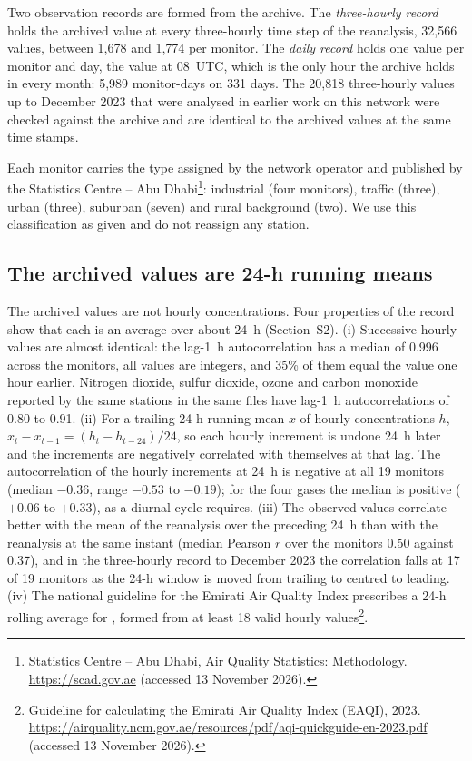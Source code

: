 Two observation records are formed from the archive. The \emph{three-hourly record} holds the
archived value at every three-hourly time step of the reanalysis, 32,566 values, between 1,678
and 1,774 per monitor. The \emph{daily record} holds one value per monitor and day, the value at
08~UTC, which is the only hour the archive holds in every month: 5,989 monitor-days on 331 days.
The 20,818 three-hourly values up to December 2023 that were analysed in earlier work on this
network were checked against the archive and are identical to the archived values at the same
time stamps.

Each monitor carries the type assigned by the network operator and published by the Statistics
Centre -- Abu Dhabi\footnote{Statistics Centre -- Abu Dhabi, Air Quality Statistics: Methodology. \url{https://scad.gov.ae} (accessed 13 November 2026).}: industrial (four monitors), traffic (three), urban
(three), suburban (seven) and rural background (two). We use this classification as given and do
not reassign any station.

\subsection{The archived values are 24-h running means}
\label{sec:running}

The archived \pmten{} values are not hourly concentrations. Four properties of the record show
that each is an average over about 24~h (Section~S2). (i) Successive hourly values are almost
identical: the lag-1~h autocorrelation has a median of 0.996 across the monitors, all values are
integers, and 35\% of them equal the value one hour earlier. Nitrogen dioxide, sulfur dioxide,
ozone and carbon monoxide reported by the same stations in the same files have lag-1~h
autocorrelations of 0.80 to 0.91. (ii) For a trailing 24-h running mean $x$ of hourly
concentrations $h$, $x_t-x_{t-1}=(h_t-h_{t-24})/24$, so each hourly increment is undone 24~h
later and the increments are negatively correlated with themselves at that lag. The
autocorrelation of the hourly \pmten{} increments at 24~h is negative at all 19 monitors (median
$-0.36$, range $-0.53$ to $-0.19$); for the four gases the median is positive ($+0.06$ to
$+0.33$), as a diurnal cycle requires. (iii) The observed values correlate better with the mean
of the reanalysis over the preceding 24~h than with the reanalysis at the same instant (median
Pearson $r$ over the monitors 0.50 against 0.37), and in the three-hourly record to December 2023
the correlation falls at 17 of 19 monitors as the 24-h window is moved from trailing to centred
to leading. (iv) The national guideline for the Emirati Air Quality Index prescribes a 24-h
rolling average for \pmten{}, formed from at least 18 valid hourly values\footnote{Guideline for calculating the Emirati Air Quality Index (EAQI), 2023. \url{https://airquality.ncm.gov.ae/resources/pdf/aqi-quickguide-en-2023.pdf} (accessed 13 November 2026).}.

